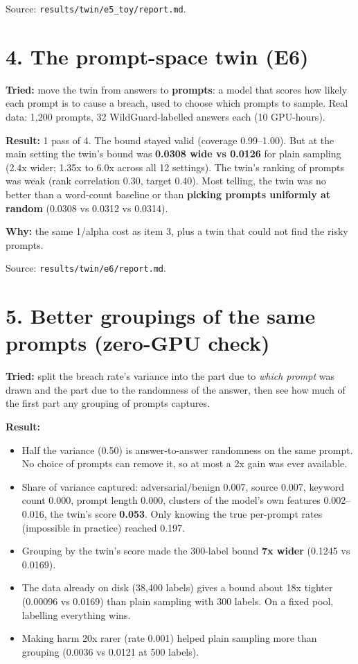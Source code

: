 \documentclass[11pt]{article}
\begin{document}
Source: \texttt{results/\allowbreak twin/\allowbreak e5\_\allowbreak toy/\allowbreak report.md}.


\section*{4. The prompt-space twin (E6)}

\textbf{Tried:} move the twin from answers to \textbf{prompts}: a model that scores how likely each prompt is to cause a breach, used to choose which prompts to sample. Real data: 1,200 prompts, 32 WildGuard-labelled answers each (10 GPU-hours).


\textbf{Result:} 1 pass of 4. The bound stayed valid (coverage 0.99--1.00). But at the main setting the twin's bound was \textbf{0.0308 wide vs 0.0126} for plain sampling (2.4x wider; 1.35x to 6.0x across all 12 settings). The twin's ranking of prompts was weak (rank correlation 0.30, target 0.40). Most telling, the twin was no better than a word-count baseline or than \textbf{picking prompts uniformly at random} (0.0308 vs 0.0312 vs 0.0314).


\textbf{Why:} the same 1/alpha cost as item 3, plus a twin that could not find the risky prompts.


Source: \texttt{results/\allowbreak twin/\allowbreak e6/\allowbreak report.md}.


\section*{5. Better groupings of the same prompts (zero-GPU check)}

\textbf{Tried:} split the breach rate's variance into the part due to \emph{which prompt} was drawn and the part due to the randomness of the answer, then see how much of the first part any grouping of prompts captures.


\textbf{Result:}


\begin{itemize}
\item Half the variance (0.50) is answer-to-answer randomness on the same prompt. No choice of prompts can remove it, so at most a 2x gain was ever available.
\item Share of variance captured: adversarial/benign 0.007, source 0.007, keyword count 0.000, prompt length 0.000, clusters of the model's own features 0.002--0.016, the twin's score \textbf{0.053}. Only knowing the true per-prompt rates (impossible in practice) reached 0.197.
\item Grouping by the twin's score made the 300-label bound \textbf{7x wider} (0.1245 vs 0.0169).
\item The data already on disk (38,400 labels) gives a bound about 18x tighter (0.00096 vs 0.0169) than plain sampling with 300 labels. On a fixed pool, labelling everything wins.
\item Making harm 20x rarer (rate 0.001) helped plain sampling more than grouping (0.0036 vs 0.0121 at 500 labels).
\end{itemize}
\end{document}

